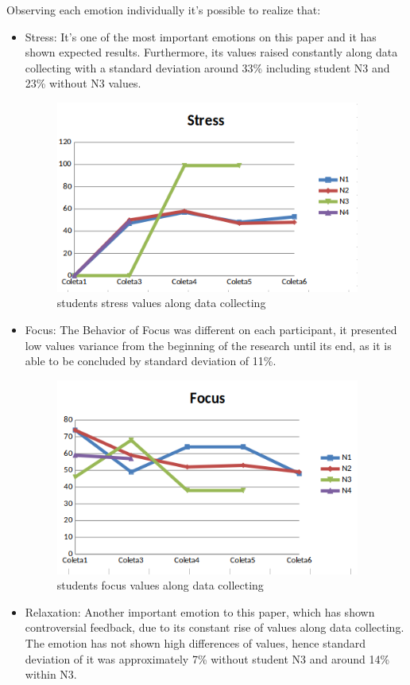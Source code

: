 \documentclass[12pt,openright,a4paper]{article}
\begin{document}
 Observing each emotion individually it’s possible to realize that:
 \begin{itemize}
 	\item Stress: It’s one of the most important emotions on this paper and it has shown expected results. Furthermore, its values raised constantly along data collecting with a standard deviation around 33\% including student N3 and 23\% without N3 values.
 	  \begin{figure}[H]
 	  	\centering
 	  	\includegraphics[width=10cm]{./stress.png}
 	  	\caption{students stress values along data collecting}
 	  \end{figure}
 	\item Focus: The Behavior of Focus was different on each participant, it presented low values variance from the beginning of the research until its end, as it is able to be concluded by standard deviation of 11\%. 
 	   \begin{figure}[H]
 	  	\centering
 	  	\includegraphics[width=10cm]{./focus.png}
 	  	\caption{students focus values along data collecting}
 	  \end{figure}
 	\item Relaxation: Another important emotion to this paper, which has shown controversial feedback, due to its constant rise of values along data collecting. The emotion has not shown high differences of values, hence standard deviation of it was approximately 7\% without student N3 and around 14\% within N3.

\end{itemize}
\end{document}

